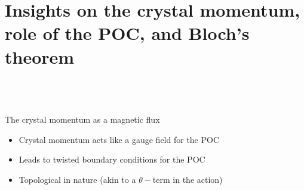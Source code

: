 \documentclass[aspectratio=169]{beamer}
\begin{document}
\section{Insights on the crystal momentum, role of the POC, and Bloch’s theorem}
\subsection{~}

\begin{frame}{The crystal momentum as a magnetic flux}
\begin{itemize}
	\item Crystal momentum acts like a \alert{gauge field} for the POC\\[10pt]
	\item Leads to twisted boundary conditions for the POC\\[10pt]
	\item Topological in nature (akin to a \alert{\(\theta-\)term} in the action)
\end{itemize}
\end{frame}
\end{document}
